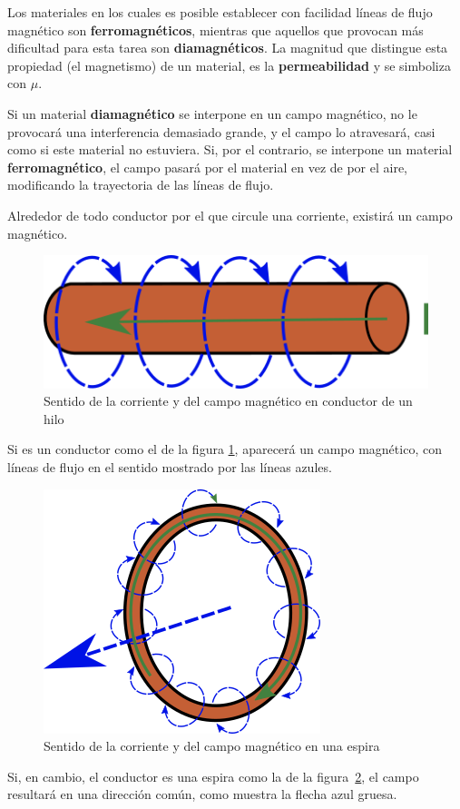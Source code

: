 Los materiales en los cuales es posible establecer con facilidad líneas de flujo magnético son \textbf{ferromagnéticos}, mientras que aquellos que provocan más dificultad para esta tarea son \textbf{diamagnéticos}. La magnitud que distingue esta propiedad (el magnetismo) de un material, es la \textbf{permeabilidad} y se simboliza con $\mu$.

Si un material \textbf{diamagnético} se interpone en un campo magnético, no le provocará una interferencia demasiado grande, y el campo lo atravesará, casi como si este material no estuviera. Si, por el contrario, se interpone un material \textbf{ferromagnético}, el campo pasará por el material en vez de por el aire, modificando la trayectoria de las líneas de flujo.

Alrededor de todo conductor por el que circule una corriente, existirá un campo magnético.

\begin{figure}
	
	\centering
		\includegraphics[scale=0.5]{images/electroiman-un-hilo}

	\caption{\label{fig:electroiman-hilo} Sentido de la corriente y del campo magnético en conductor de un hilo}
\end{figure}

Si es un conductor como el de la figura \ref{fig:electroiman-hilo}, aparecerá un campo magnético, con líneas de flujo en el sentido mostrado por las líneas azules.

\begin{figure}
	\centering
		\includegraphics[scale=0.5]{images/electroiman-espira}
	
	\caption{\label{fig:electroiman-espira} Sentido de la corriente y del campo magnético en una espira}
\end{figure}
Si, en cambio, el conductor es una espira como la de la figura~\ref{fig:electroiman-espira}, el campo resultará en una dirección común, como muestra la flecha azul gruesa.

